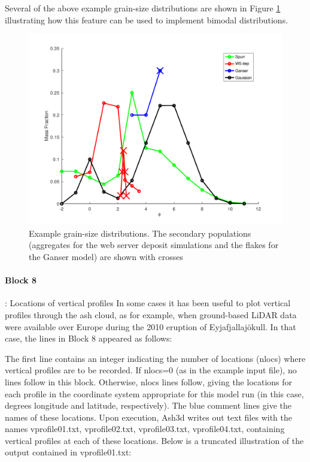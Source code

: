 Several of the above example grain-size distributions are shown in 
Figure \ref{FigInputGSD} 
illustrating how this feature can be used to implement bimodal distributions.
\begin{figure}[htbp]
\begin{center}
\includegraphics[angle=0,scale=0.7]{Figures/Scripts/InputGSD/FigInputGSD.pdf}
\parbox{15cm}{\caption{\label{FigInputGSD}
Example grain-size distributions.  The secondary populations (aggregates for the web
server deposit simulations and the flakes for the Ganser model) are shown with
crosses}}
\end{center}
\end{figure}

\paragraph{Block 8}: Locations of vertical profiles
In some cases it has been useful to plot vertical profiles through the ash cloud, as for
example, when ground-based LiDAR data were available over Europe during the 2010
eruption of Eyjafjallaj\"okull. In that case, the lines in Block 8 appeared as follows:

The first line contains an integer indicating the number of locations (nlocs) where
vertical profiles are to be recorded. If nlocs=0 (as in the example input file), no
lines follow in this block. Otherwise, nlocs lines follow, giving the locations for
each profile in the coordinate system appropriate for this model run (in this case,
degrees longitude and latitude, respectively). The blue comment lines give the names
of these locations.
Upon execution, Ash3d writes out text files with the names vprofile01.txt,
vprofile02.txt, vprofile03.txt, vprofile04.txt, containing vertical profiles at each
of these locations. Below is a truncated illustration of the output contained in
vprofile01.txt:

